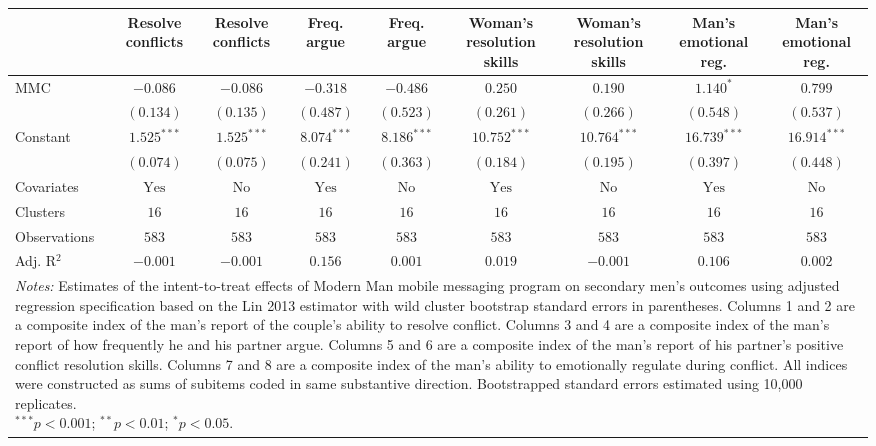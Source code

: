 
\begin{tabular}{l c c c c c c c c}
\toprule
 & Resolve conflicts & Resolve conflicts & Freq. argue & Freq. argue & Woman's resolution skills & Woman's resolution skills & Man's emotional reg. & Man's emotional reg. \\
\midrule
MMC          & $-0.086$       & $-0.086$      & $-0.318$       & $-0.486$      & $0.250$        & $0.190$        & $1.140^{*}$    & $0.799$        \\
             & $(0.134)$      & $(0.135)$     & $(0.487)$      & $(0.523)$     & $(0.261)$      & $(0.266)$      & $(0.548)$      & $(0.537)$      \\
Constant     & $1.525^{***}$  & $1.525^{***}$ & $8.074^{***}$  & $8.186^{***}$ & $10.752^{***}$ & $10.764^{***}$ & $16.739^{***}$ & $16.914^{***}$ \\
             & $(0.074)$      & $(0.075)$     & $(0.241)$      & $(0.363)$     & $(0.184)$      & $(0.195)$      & $(0.397)$      & $(0.448)$      \\
\midrule
Covariates   & $\textrm{Yes}$ & $\textrm{No}$ & $\textrm{Yes}$ & $\textrm{No}$ & $\textrm{Yes}$ & $\textrm{No}$  & $\textrm{Yes}$ & $\textrm{No}$  \\
Clusters     & $16$           & $16$          & $16$           & $16$          & $16$           & $16$           & $16$           & $16$           \\
Observations & $583$          & $583$         & $583$          & $583$         & $583$          & $583$          & $583$          & $583$          \\
Adj. R$^2$   & $-0.001$       & $-0.001$      & $0.156$        & $0.001$       & $0.019$        & $-0.001$       & $0.106$        & $0.002$        \\
\bottomrule
\multicolumn{9}{l}{\scriptsize{\parbox{\linewidth}{\vspace{2pt}
       \textit{Notes:} Estimates of the intent-to-treat effects of Modern Man mobile
       messaging program on secondary men's outcomes using adjusted regression
       specification based on the Lin 2013 estimator with wild cluster bootstrap
       standard errors in parentheses. Columns 1 and 2 are a composite index of
       the man's report of the couple's ability to resolve conflict. Columns 3 and 4
       are a composite index of the man's report of how frequently he and his partner argue. 
       Columns 5 and 6 are a composite index of the man's report of his partner's positive conflict 
       resolution skills. Columns 7 and 8 are a composite index of the man's ability to emotionally regulate
       during conflict. All indices were constructed as sums of subitems coded in same 
       substantive direction. Bootstrapped standard errors estimated using 10,000 replicates. \\ $^{***}p<0.001$; $^{**}p<0.01$; $^{*}p<0.05$.}}}
\end{tabular}
